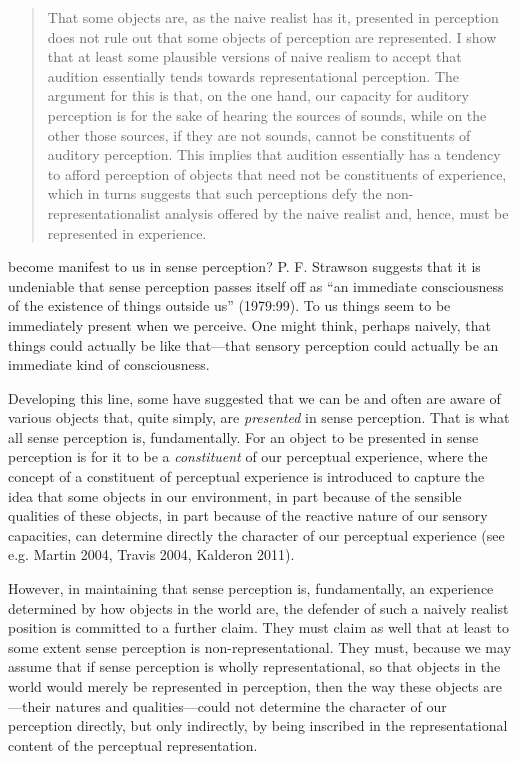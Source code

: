 \documentclass[sloppy, journal, git, bytitle, dodraft]{humapap}
\begin{document}
\documenttitle

\begin{abstract}That some objects are, as the naive realist has it, presented in perception does not rule out that some objects of perception are represented. I show that at least some plausible versions of naive realism to accept that audition essentially tends towards representational perception. The argument for this is that,  on the one hand, our capacity for auditory perception is for the sake of hearing the sources of sounds, while on the other those sources, if they are not sounds, cannot be constituents of auditory perception. This implies that audition essentially has a tendency to afford perception of objects that need not be constituents of experience, which in turns suggests that such perceptions defy the non-representationalist analysis offered by the naive realist and, hence, must be represented in experience.\end{abstract}
	

 become manifest to us in sense perception? P. F. Strawson suggests that it is undeniable that sense perception passes itself off as ``an immediate consciousness of the existence of things outside us'' (1979:99). To us things seem to be immediately present when we perceive. One might think, perhaps naively, that things could actually be like that---that sensory perception could actually be an immediate kind of consciousness. 

Developing this line, some have suggested that we can be and often are aware of various objects that, quite simply, are \emph{presented} in sense perception. That is what all sense perception is, fundamentally. For an object to be presented in sense perception is for it to be a \emph{constituent} of our perceptual experience, where the concept of a constituent of perceptual experience is introduced to capture the idea that some objects in our environment, in part because of the sensible qualities of these objects, in part because of the reactive nature of our sensory capacities, can determine directly the character of our perceptual experience (see e.g. Martin 2004, Travis 2004, Kalderon 2011).   

However, in maintaining that  sense perception is, fundamentally, an experience determined by how objects in the world are, the defender of such a naively realist position is committed to a further claim. They must claim as well that at least to some extent sense perception is non-representational. They must, because we may assume that if sense perception is wholly representational, so that objects in the world would merely be represented in perception, then the way these objects are---their natures and qualities---could not determine the character of our perception directly, but only indirectly, by being inscribed in the representational content of the perceptual representation. 
\end{document}
